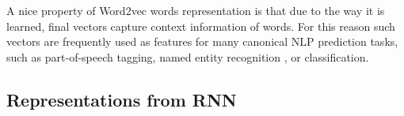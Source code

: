 A nice property of Word2vec words representation is that due to the way it is learned, final vectors capture context information of words. For this reason such vectors are frequently used as features for many canonical NLP prediction tasks, such as part-of-speech tagging, named entity recognition \citep{Collobert:DBLP}, or classification.


\subsection{Representations from RNN}
